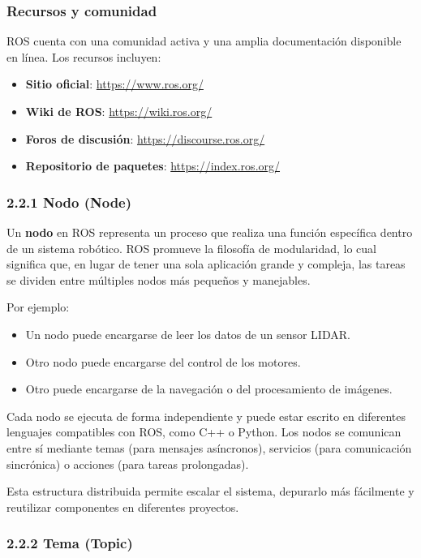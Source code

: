 \subsubsection{Recursos y comunidad}

ROS cuenta con una comunidad activa y una amplia documentación disponible en línea. Los recursos incluyen:

\begin{itemize}
	\item \textbf{Sitio oficial}: \url{https://www.ros.org/}
	\item \textbf{Wiki de ROS}: \url{https://wiki.ros.org/}
	\item \textbf{Foros de discusión}: \url{https://discourse.ros.org/}
	\item \textbf{Repositorio de paquetes}: \url{https://index.ros.org/}
\end{itemize}

\subsubsection{2.2.1 Nodo (Node)}

Un \textbf{nodo} en ROS representa un proceso que realiza una función específica dentro de un sistema robótico. ROS promueve la filosofía de modularidad, lo cual significa que, en lugar de tener una sola aplicación grande y compleja, las tareas se dividen entre múltiples nodos más pequeños y manejables.

Por ejemplo:
\begin{itemize}
	\item Un nodo puede encargarse de leer los datos de un sensor LIDAR.
	\item Otro nodo puede encargarse del control de los motores.
	\item Otro puede encargarse de la navegación o del procesamiento de imágenes.
\end{itemize}

Cada nodo se ejecuta de forma independiente y puede estar escrito en diferentes lenguajes compatibles con ROS, como C++ o Python. Los nodos se comunican entre sí mediante temas (para mensajes asíncronos), servicios (para comunicación sincrónica) o acciones (para tareas prolongadas).

Esta estructura distribuida permite escalar el sistema, depurarlo más fácilmente y reutilizar componentes en diferentes proyectos.

\subsubsection{2.2.2 Tema (Topic)}

